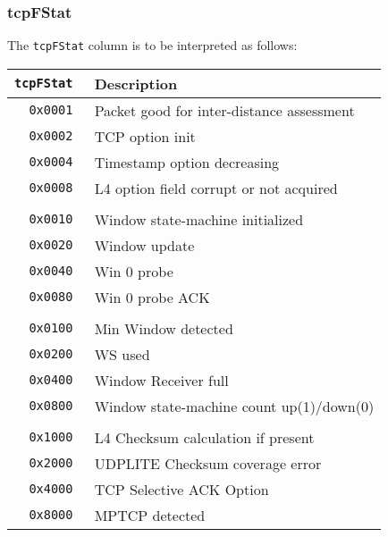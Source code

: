 \documentclass[documentation]{subfiles}
\begin{document}
\subsubsection{tcpFStat}\label{tcpFStat}
The {\tt tcpFStat} column is to be interpreted as follows:
\begin{longtable}{>{\tt}rl}
    \toprule
    {\bf tcpFStat} & {\bf Description}\\
    \midrule\endhead%
    0x0001 & Packet good for inter-distance assessment\\
    0x0002 & TCP option init\\
    0x0004 & Timestamp option decreasing\\
    0x0008 & L4 option field corrupt or not acquired\\
    \\
    0x0010 & Window state-machine initialized\\
    0x0020 & Window update\\
    0x0040 & Win 0 probe\\
    0x0080 & Win 0 probe ACK\\
    \\
    0x0100 & Min Window detected\\
    0x0200 & WS used\\
    0x0400 & Window Receiver full\\
    0x0800 & Window state-machine count up(1)/down(0)\\
    \\
    0x1000 & L4 Checksum calculation if present\\
    0x2000 & UDPLITE Checksum coverage error\\
    0x4000 & TCP Selective ACK Option\\
    0x8000 & MPTCP detected\\
    \bottomrule
\end{longtable}
\end{document}
